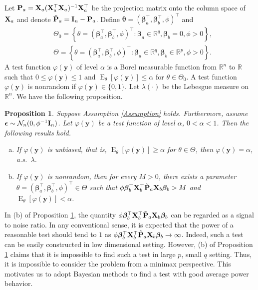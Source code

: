 \documentclass[bj]{imsart}
\DeclareMathOperator{\myE}{E}
\newcommand{\By}{\mathbf{y}}    \newcommand{\Bz}{\mathbf{z}}
\newcommand{\bfsym}[1]{\ensuremath{\boldsymbol{#1}}}
\def\bbeta{\bfsym \beta}
\def\btheta{\bfsym {\theta}}           \def\bTheta {\bfsym {\Theta}}
\theoremstyle{plain}
\newtheorem{proposition}{\quad\quad Proposition}
\theoremstyle{definition}
\theoremstyle{remark}
\begin{document}
Let $\mathbf{P}_a=\mathbf{X}_a(\mathbf{X}_a^\top \mathbf{X}_a)^{-1} \mathbf{X}_a^\top$ be the projection matrix onto the column space of $\mathbf{X}_a$ and denote $\tilde {\mathbf{P}}_a = \mathbf{I}_n-\mathbf{P}_a$.
Define $\btheta =(\bbeta_a^\top , \bbeta_b^\top , \phi)^\top$ and 
\begin{equation*}
    \begin{split}
        &\Theta_0 = \left\{\theta=(\bbeta_a^\top , \bbeta_b^\top , \phi)^\top: \bbeta_a \in \mathbb R^{q}, \bbeta_b=0, \phi>0\right\},
    \\
    &\Theta = \left\{\theta=(\bbeta_a^\top , \bbeta_b^\top , \phi)^\top: \bbeta_a \in \mathbb R^{q}, \bbeta_b\in \mathbb R^p, \phi>0\right\}.
    \end{split}
\end{equation*}
A test function $\varphi(\By)$ of level $\alpha$ is a Borel measurable function from $\mathbb R^n$ to $\mathbb R$ such that $0\leq \varphi(\By) \leq 1$ and $\myE_\theta [\varphi(\By)]\leq \alpha$ for $\theta\in \Theta_0$.
A test function $\varphi(\By)$ is nonrandom if $\varphi(\By)\in\{0,1\}$.
Let $\lambda(\cdot)$ be the Lebesgue measure on $\mathbb R^n$.
We have the following proposition.
\begin{proposition}\label{prop:unbiased}
    Suppose Assumption \ref{Assumption} holds.
    Furthermore, assume $\bepsilon\sim \mathcal N_n (0, \phi^{-1}\BI_n)$.
    Let $\varphi(\By)$ be a test function of level $\alpha$, $0 <\alpha <1$.
Then the following results hold.
\begin{enumerate}[(a)]
    \item 
        If $\varphi(\By)$ is unbiased, that is, $\myE_\theta [\varphi(\By)]\geq \alpha$ for $\theta \in \Theta$, then $\varphi(\By)=\alpha$, a.s.\ $\lambda$.
\item
    If $\varphi(\By)$ is nonrandom, then for every $M>0$, there exists a parameter $\theta=(\bbeta_a^\top,\bbeta_b^\top,\phi)^\top \in \Theta$ such that $\phi\bbeta_b^\top \BX_b^\top \tilde \BP_a \BX_b \bbeta_b > M$ and $\myE_\theta [\varphi(\By)]< \alpha$.
\end{enumerate}
\end{proposition}
In (b) of Proposition \ref{prop:unbiased}, the quantity $\phi \bbeta_b^\top \BX_b^\top \tilde \BP_a \BX_b \bbeta_b$ can be regarded as a signal to noise ratio.
In any conventional sense, it is expected that the power of a reasonable test should tend to $1$ as $\phi \bbeta_b^\top \BX_b^\top \tilde \BP_a \BX_b \bbeta_b \to \infty$.
Indeed, such a test can be easily constructed in low dimensional setting.
However, (b) of Proposition \ref{prop:unbiased} claims that it is impossible to find such a test in large $p$, small $q$ setting.
Thus, it is impossible to consider the problem from a minimax perspective.
This motivates us 
to adopt Bayesian methods
to find a test with good average power behavior.
\end{document}
